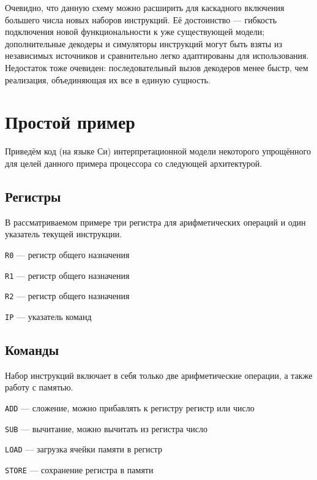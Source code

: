 Очевидно, что данную схему можно расширить для каскадного включения большего числа новых наборов инструкций. Её достоинство --- гибкость подключения новой функциональности к уже существующей модели; дополнительные декодеры и симуляторы инструкций могут быть взяты из независимых источников и сравнительно легко адаптированы для использования. Недостаток тоже очевиден: последовательный вызов декодеров менее быстр, чем реализация, объединяющая их все в единую сущность.

\section{Простой пример}

Приведём код (на языке Си) интерпретационной модели некоторого упрощённого для целей данного примера процессора со следующей архитектурой.

\subsection{Регистры}

В рассматриваемом примере три регистра для арифметических операций и один указатель текущей инструкции.

\begin{itemize*}
\item    \texttt{R0} --- регистр общего назначения
\item    \texttt{R1} --- регистр общего назначения
\item    \texttt{R2} --- регистр общего назначения
\item    \texttt{IP} --- указатель команд
\end{itemize*}

\subsection{Команды}

Набор инструкций включает в себя только две арифметические операции, а также работу с памятью.

\begin{itemize*}
    \item \texttt{ADD} --- сложение, можно прибавлять к регистру регистр или число
    \item \texttt{SUB} --- вычитание, можно вычитать из регистра число
    \item \texttt{LOAD} --- загрузка ячейки памяти в регистр
    \item \texttt{STORE} --- сохранение регистра в памяти
\end{itemize*}

